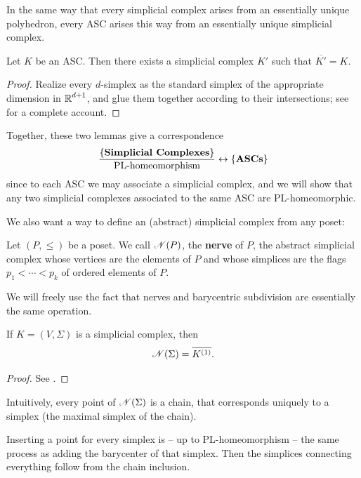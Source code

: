 In the same way that every simplicial complex arises from an essentially unique polyhedron, every ASC arises this way from an essentially unique simplicial complex.
\begin{lemma}
    Let $K$ be an ASC. Then there exists a simplicial complex $K'$ such that $\overline{K'}=K$.
\end{lemma}
\begin{proof}
    Realize every $d$-simplex as the standard simplex of the appropriate dimension in $\operatorname{\mathbb{R}}^{d+1}$, and glue them together according to their intersections; see \cite{PLTopology} for a complete account.
\end{proof}
Together, these two lemmas give a correspondence
\[\dfrac{\left\{ \textbf{Simplicial Complexes} \right\}}{\text{PL-homeomorphism}}\leftrightarrow\left\{ \textbf{ASCs} \right\}\]
since to each ASC we may associate a simplicial complex, and we will show that any two simplicial complexes associated to the same ASC are PL-homeomorphic.

We also want a way to define an (abstract) simplicial complex from any poset:

\begin{definition}[Nerve]
    Let $(P,\leq)$ be a poset. We call $\operatorname{\mathscr{N}}(P)$, the \textbf{nerve} of $P$, the abstract simplicial complex whose vertices are the elements of $P$ and whose simplices are the flags $p_1<\cdots<p_k$ of ordered elements of $P$.
\end{definition}

We will freely use the fact that nerves and barycentric subdivision are essentially the same operation.
\begin{theorem}
    If $K=(V,\Sigma)$ is a simplicial complex, then
    \[\operatorname{\mathscr{N}}(\Sigma)=\overline{K^{(1)}}.\]
\end{theorem}
\begin{proof}
    See \cite{PLTopology}.
\end{proof}
Intuitively, every point of $\operatorname{\mathscr{N}}(\Sigma)$ is a chain, that corresponds uniquely to a simplex (the maximal simplex of the chain).

Inserting a point for every simplex is -- up to PL-homeomorphism -- the same process as adding the barycenter of that simplex.
Then the simplices connecting everything follow from the chain inclusion.

